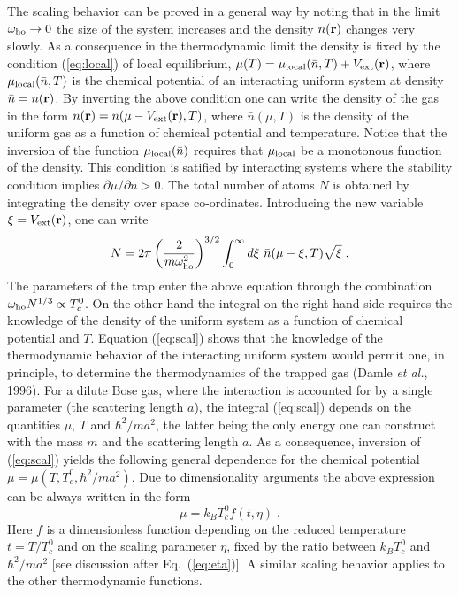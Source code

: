 The scaling behavior can
be  proved in a  general way by noting that in  the
limit $\omega_{\rm ho}\to 0$ the size of the system increases and the
density $n({\bf r})$ changes very slowly. As a consequence in the
thermodynamic limit the density is fixed by the condition (\ref{eq:local})
of local equilibrium, $\mu(T)=\mu_{\rm local}(\bar{n},T)+
V_{\rm ext}({\bf r})$, where
$\mu_{\rm local}(\bar{n},T)$ is the chemical potential of an interacting
uniform system at  density $\bar{n}=n({\bf r})$.  By inverting the
above condition one can write  the density of the gas in the form
 $n({\bf r})=\bar{n}(\mu-V_{\rm ext}({\bf r}),T)$, where $\bar{n}(\mu,T)$ is
the density of the uniform gas as a function of chemical potential 
and temperature. Notice that the inversion of the function
$\mu_{\rm local}(\bar{n})$ requires that $\mu_{\rm local}$ be a 
monotonous function
of the density. This condition is satified by interacting systems
where the stability condition implies $\partial \mu/\partial n >0$. 
The total number of atoms $N$ is obtained by integrating the density over 
space  co-ordinates.   
Introducing the new variable $\xi=V_{\rm ext}({\bf r})$,
one  can write  
\begin{equation}
N=2\pi
\left(\frac{2}{m\omega_{\rm ho}^2}\right)^{3/2} \int_0^\infty d\xi \
\bar{n}(\mu-\xi,T)\sqrt{\xi} \;.
\label{eq:scal}
\end{equation}
The parameters of the trap enter  the above equation through the
combination  $\omega_{\rm ho}N^{1/3}\propto T_c^0$. On the other hand
the integral on the right hand side  requires the knowledge of the
density of the uniform system as a function of chemical
potential and $T$.  Equation (\ref{eq:scal}) shows that the
knowledge of the thermodynamic behavior of the interacting uniform
system would permit one, in principle, to determine 
the thermodynamics of the
trapped  gas (Damle {\it et al.}, 1996). For a dilute Bose gas, where the
interaction  is accounted for by a single parameter (the scattering length
$a$), the integral (\ref{eq:scal}) depends on the quantities $\mu$,
$T$ and   $\hbar^2/ma^2$, the latter being the only energy  one
can construct  with the mass $m$ and the scattering length $a$. As
a consequence, inversion of (\ref{eq:scal}) yields the following
general dependence for the chemical potential $\mu = \mu(T, T_c^0,
\hbar^2/ma^2)$. Due to dimensionality arguments the above expression
can be always written in the form
\begin{equation}
\mu=k_BT_c^0
f(t,\eta) \; .
\label{eq:scal1}
\end{equation}
Here $f$ is a dimensionless function depending on the reduced
temperature $t=T/T_c^0$ and on the scaling parameter $\eta$, fixed by
the ratio between $k_BT_c^0$ and $\hbar^2/ ma^2$  [see discussion
after Eq.~(\ref{eq:eta})].  A similar scaling behavior applies to
the other thermodynamic functions.

